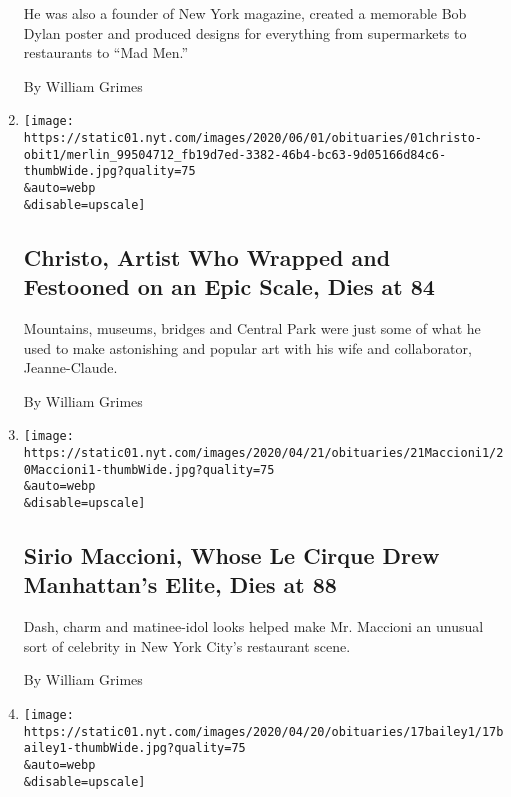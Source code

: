 \begin{enumerate}
  He was also a founder of New York magazine, created a memorable Bob
  Dylan poster and produced designs for everything from supermarkets to
  restaurants to ``Mad Men.''

  By William Grimes
\item
  \href{/2020/05/31/arts/christo-dead.html}{}

  \texttt{[image: https://static01.nyt.com/images/2020/06/01/obituaries/01christo-obit1/merlin\_99504712\_fb19d7ed-3382-46b4-bc63-9d05166d84c6-thumbWide.jpg?quality=75\\\&auto=webp\\\&disable=upscale]}

  \hypertarget{christo-artist-who-wrapped-and-festooned-on-an-epic-scale-dies-at-84}{%
  \subsection{Christo, Artist Who Wrapped and Festooned on an Epic
  Scale, Dies at
  84}\label{christo-artist-who-wrapped-and-festooned-on-an-epic-scale-dies-at-84}}

  Mountains, museums, bridges and Central Park were just some of what he
  used to make astonishing and popular art with his wife and
  collaborator, Jeanne-Claude.

  By William Grimes
\item
  \href{/2020/04/20/dining/sirio-maccioni-dead.html}{}

  \texttt{[image: https://static01.nyt.com/images/2020/04/21/obituaries/21Maccioni1/20Maccioni1-thumbWide.jpg?quality=75\\\&auto=webp\\\&disable=upscale]}

  \hypertarget{sirio-maccioni-whose-le-cirque-drew-manhattans-elite-dies-at-88}{%
  \subsection{Sirio Maccioni, Whose Le Cirque Drew Manhattan's Elite,
  Dies at
  88}\label{sirio-maccioni-whose-le-cirque-drew-manhattans-elite-dies-at-88}}

  Dash, charm and matinee-idol looks helped make Mr. Maccioni an unusual
  sort of celebrity in New York City's restaurant scene.

  By William Grimes
\item
  \href{/2020/04/18/arts/william-bailey-dead.html}{}

  \texttt{[image: https://static01.nyt.com/images/2020/04/20/obituaries/17bailey1/17bailey1-thumbWide.jpg?quality=75\\\&auto=webp\\\&disable=upscale]}

  \hypertarget{william-bailey-modernist-figurative-painter-dies-at-89}{%
}
\end{enumerate}
